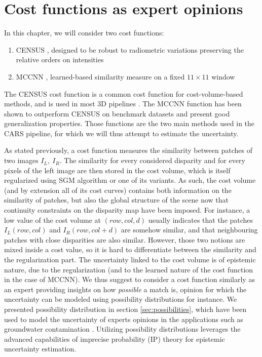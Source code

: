 \section{Cost functions as expert opinions}
In this chapter, we will consider two cost functions:
\begin{enumerate}
    \item CENSUS \cite{zabih_non-parametric_1994}, designed to be robust to radiometric variations preserving the relative orders on intensities
    \item MCCNN \cite{zbontar_stereo_2016}, learned-based similarity measure on a fixed $11\times 11$ window
\end{enumerate}
The CENSUS cost function is a common cost function for cost-volume-based methods, and is used in most 3D pipelines \cite{franchis_automatic_2014,shean_automated_2016,rupnik_micmac_2017,youssefi_cars_2020}. The MCCNN function has been shown to outperform CENSUS on benchmark datasets \cite{zbontar_stereo_2016} and present good generalization properties. Those functions are the two main methods used in the CARS pipeline, for which we will thus attempt to estimate the uncertainty. 

As stated previously, a cost function measures the similarity between patches of two images \(I_L,~I_R\). The similarity for every considered disparity and for every pixels of the left image are then stored in the cost volume, which is itself regularized using SGM algorithm or one of its variants. As such, the cost volume (and by extension all of its cost curves) contains both information on the similarity of patches, but also the global structure of the scene now that continuity constraints on the disparity map have been imposed. For instance, a low value of the cost volume at \( (row, col, d) \) usually indicates that the patches \(I_L(row,col)\)  and \(I_R(row,col+d)\) are somehow similar, and that neighbouring patches with close disparities are also similar. However, those two notions are mixed inside a cost value, so it is hard to differentiate between the similarity and the regularization part. The uncertainty linked to the cost volume is of epistemic nature, due to the regularization (and to the learned nature of the cost function in the case of MCCNN). We thus suggest to consider a cost function similarly as an expert providing insights on how \textit{possible} a match is, opinion for which the uncertainty can be modeled using possibility distributions for instance. We presented possibility distribution in section \ref{sec:possibilities}, which have been used to model the uncertainty of experts opinions in the applications such as groundwater contamination \cite{bardossy_l-_1995, baudrit_joint_2007}. Utilizing possibility distributions leverages the advanced capabilities of imprecise probability (IP) theory for epistemic uncertainty estimation.

